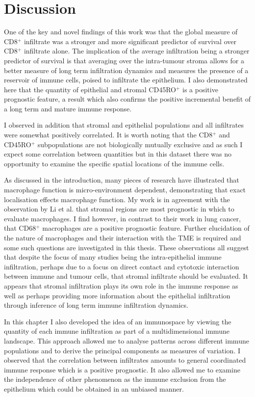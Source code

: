\section{Discussion}
 One of the key and novel findings of this work was that the global measure of CD8$^+$ infiltrate was a stronger and more significant predictor of survival over CD8$^+$ infiltrate alone. The implication of the average infiltration being a stronger predictor of survival is that averaging over the intra-tumour stroma allows for a better measure of long term infiltration dynamics and measures the presence of a reservoir of immune cells, poised to infiltrate the epithelium.  I also demonstrated here that the quantity of epithelial and stromal CD45RO$^+$ is a positive prognostic feature, a result which also confirms the positive incremental benefit of a long term and mature immune response. 
 
 I observed in addition that stromal and epithelial populations and all infiltrates were somewhat positively correlated. It is worth noting that the  CD8$^+$ and  CD45RO$^+$ subpopulations are not biologically mutually exclusive and as such I expect some correlation between quantities but in this dataset there was no opportunity to examine the specific spatial locations of the immune cells. 

As discussed in the introduction, many pieces of research have illustrated that macrophage function is micro-environment dependent\cite{ZhangMacrophage2014, li2018intratumoral}, demonstrating that exact localisation effects macrophage function. My work is in agreement with the observation by Li et al. that stromal regions are most prognostic in which to evaluate macrophages. I find however, in contrast to their work in lung cancer, that CD68$^+$ macrophages are a positive prognostic feature. Further elucidation of the nature of macrophages and their interaction with the TME is required and some such questions are investigated in this thesis.
These observations all suggest that despite the focus of many studies being the intra-epithelial immune infiltration, perhaps due to a focus on direct contact and cytotoxic interaction between immune and tumour cells, that stromal infiltrate should be evaluated. It appears that stromal infiltration plays its own role in the immune response as well as perhaps providing more information about the epithelial infiltration through inference of long term immune infiltration dynamics.

In this chapter I also developed the idea of an immunospace by viewing the quantity of each immune infiltration as part of a multidimensional immune landscape. This approach allowed me to analyse patterns across different immune populations and to derive the principal components as measures of variation. I observed that the correlation between infiltrates amounts to general coordinated immune response which is a positive prognostic. It also allowed me to examine the independence of other phenomenon as the immune exclusion from the epithelium which could be obtained in an unbiased manner.


